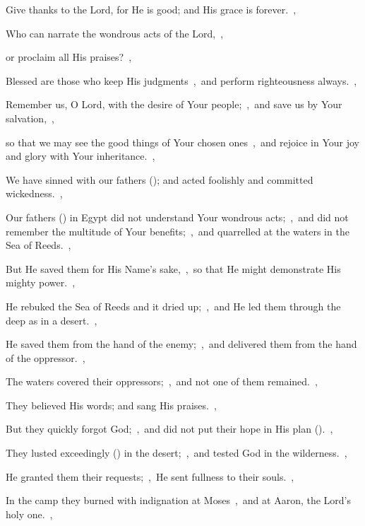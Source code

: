 \documentclass[12pt,twoside,a5paper]{article}
\begin{document}
\begin{normalparskip}
  Give thanks to the Lord, for He is good; and His grace is forever.~\sep

  Who can narrate the wondrous acts of the Lord,~\sep


  or proclaim all His praises?~\sep

  Blessed are those who keep His judgments~\sep\ and perform righteousness always.~\sep

  Remember us, O Lord, with the desire of Your people;~\sep\ and save us by Your salvation,~\sep

  so that we may see the good things of Your chosen ones~\sep\ and rejoice in Your joy and glory with Your inheritance.~\sep

  We have sinned with our fathers (); and acted foolishly and committed wickedness.~\sep

  Our fathers () in Egypt did not understand Your wondrous acts;~\sep\ and did not remember the multitude of Your benefits;~\sep\ and quarrelled at the waters in the Sea of Reeds.~\sep

  But He saved them for His Name's sake,~\sep\ so that He might demonstrate His mighty power.~\sep

  He rebuked the Sea of Reeds and it dried up;~\sep\ and He led them through the deep as in a desert.~\sep

  He saved them from the hand of the enemy;~\sep\ and delivered them from the hand of the oppressor.~\sep

  The waters covered their oppressors;~\sep\ and not one of them remained.~\sep

  They believed His words; and sang His praises.~\sep

  But they quickly forgot God;~\sep\ and did not put their hope in His plan ().~\sep

  They lusted exceedingly () in the desert;~\sep\ and tested God in the wilderness.~\sep

  He granted them their requests;~\sep\ He sent fullness to their souls.~\sep

  In the camp they burned with indignation at Moses~\sep\ and at Aaron, the Lord's holy one.~\sep


\end{normalparskip}
\end{document}
